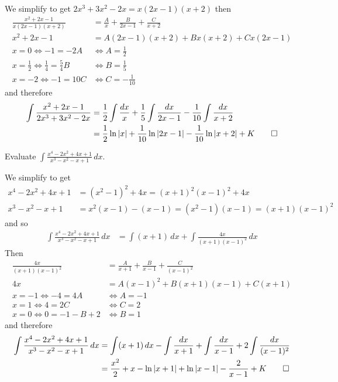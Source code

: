 \begin{solution}
    We simplify to get \(2x^3+3x^2-2x=x(2x-1)(x+2)\) then
    \begin{align*}
        \frac{x^2+2x-1}{x(2x-1)(x+2)} &=
        \frac{A}{x}+\frac{B}{2x-1}+\frac{C}{x+2} \\
        x^2+2x-1 &= A(2x-1)(x+2)+Bx(x+2)+Cx(2x-1) \\
        x=0\iff -1=-2A &\iff A=\frac{1}{2} \\
        x=\frac{1}{2}\iff \frac{1}{4}=\frac{5}{4}B &\iff B=\frac{1}{5} \\
        x=-2\iff -1=10C &\iff C=-\frac{1}{10}
    \end{align*}
    and therefore
    \begin{align*}
        \int\frac{x^2+2x-1}{2x^3+3x^2-2x}
        &= \frac{1}{2}\int\frac{dx}{x}+\frac{1}{5}\int\frac{dx}{2x-1}
        -\frac{1}{10}\int\frac{dx}{x+2} \\
        &= \frac{1}{2}\ln|x|+\frac{1}{10}\ln|2x-1|
        -\frac{1}{10}\ln|x+2|+K \qedhere
    \end{align*}
\end{solution}
\begin{problem}
    Evaluate \(\displaystyle{\int\frac{x^4-2x^2+4x+1}{x^3-x^2-x+1}\,dx}\).
\end{problem}
\begin{solution}
    We simplify to get
    \begin{align*}
        x^4-2x^2+4x+1 &=(x^2-1)^2+4x=(x+1)^2(x-1)^2+4x \\
        x^3-x^2-x+1 &= x^2(x-1)-(x-1)=(x^2-1)(x-1)=(x+1)(x-1)^2
    \end{align*}
    and so
    \begin{align*}
        \int\frac{x^4-2x^2+4x+1}{x^3-x^2-x+1}\,dx
        &= \int(x+1)\,dx+\int\frac{4x}{(x+1)(x-1)^2}\,dx
    \end{align*}
    Then
    \begin{align*}
        \frac{4x}{(x+1)(x-1)^2} &=
        \frac{A}{x+1}+\frac{B}{x-1}+\frac{C}{(x-1)^2} \\
        4x &= A(x-1)^2+B(x+1)(x-1)+C(x+1) \\
        x=-1\iff -4=4A &\iff A=-1 \\ x=1\iff 4=2C &\iff C=2 \\
        x=0\iff 0=-1-B+2 &\iff B=1
    \end{align*}
    and therefore
    \begin{align*}
        \int\frac{x^4-2x^2+4x+1}{x^3-x^2-x+1}\,dx
        &= \int(x+1)\,dx-\int\frac{dx}{x+1}+\int\frac{dx}{x-1}
        +2\int\frac{dx}{(x-1)^2} \\
        &= \frac{x^2}{2}+x-\ln|x+1|+\ln|x-1|-\frac{2}{x-1}+K \qedhere
    \end{align*}
\end{solution}
